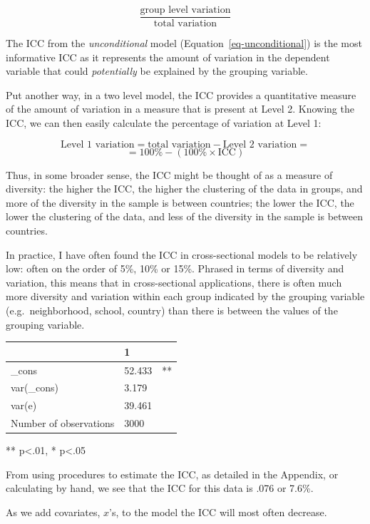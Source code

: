 \documentclass[
  letterpaper,
  DIV=11,
  numbers=noendperiod]{scrreprt}
\begin{document}
\[\frac{\text{group level variation}}{\text{total variation}}\]

The ICC from the \emph{unconditional} model
(Equation~\ref{eq-unconditional}) is the most informative ICC as it
represents the amount of variation in the dependent variable that could
\emph{potentially} be explained by the grouping variable.

Put another way, in a two level model, the ICC provides a quantitative
measure of the amount of variation in a measure that is present at Level
2. Knowing the ICC, we can then easily calculate the percentage of
variation at Level 1:

\[\text{Level 1 variation} = \text{total variation} - \text{Level 2 variation} =\]
\[= 100\% - (100\% \times \text{ICC})\]

Thus, in some broader sense, the ICC might be thought of as a measure of
diversity: the higher the ICC, the higher the clustering of the data in
groups, and more of the diversity in the sample is between countries;
the lower the ICC, the lower the clustering of the data, and less of the
diversity in the sample is between countries.

In practice, I have often found the ICC in cross-sectional models to be
relatively low: often on the order of 5\%, 10\% or 15\%. Phrased in
terms of diversity and variation, this means that in cross-sectional
applications, there is often much more diversity and variation within
each group indicated by the grouping variable (e.g.~neighborhood,
school, country) than there is between the values of the grouping
variable.

\begin{longtable}[]{@{}lll@{}}
\toprule\noalign{}
& 1 & \\
\midrule\noalign{}
\endhead
\bottomrule\noalign{}
\endlastfoot
\_cons & 52.433 & ** \\
var(\_cons) & 3.179 & \\
var(e) & 39.461 & \\
Number of observations & 3000 & \\
\end{longtable}

** p\textless.01, * p\textless.05

From using procedures to estimate the ICC, as detailed in the Appendix,
or calculating by hand, we see that the ICC for this data is .076 or
7.6\%.

As we add covariates, \(x\)'s, to the model the ICC will most often
decrease.
\end{document}
